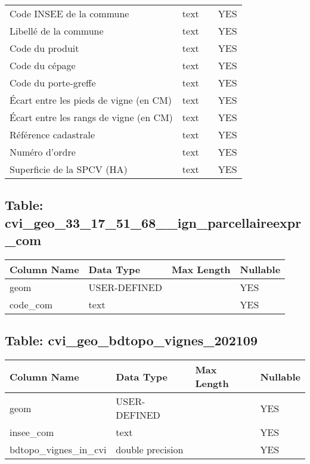 \begin{tabular}{llrl}
 Code INSEE de la commune               & text              &              & YES        \\
 Libellé de la commune                  & text              &              & YES        \\
 Code du produit                        & text              &              & YES        \\
 Code du cépage                         & text              &              & YES        \\
 Code du porte-greffe                   & text              &              & YES        \\
 Écart entre les pieds de vigne (en CM) & text              &              & YES        \\
 Écart entre les rangs de vigne (en CM) & text              &              & YES        \\
 Référence cadastrale                   & text              &              & YES        \\
 Numéro d'ordre                         & text              &              & YES        \\
 Superficie de la SPCV (HA)             & text              &              & YES        \\
\hline
\end{tabular}
\subsection*{Table: cvi_geo_33_17_51_68__ign_parcellaireexpr_com}
\begin{tabular}{llll}
\hline
 Column Name   & Data Type    & Max Length   & Nullable   \\
\hline
 geom          & USER-DEFINED &              & YES        \\
 code_com      & text         &              & YES        \\
\hline
\end{tabular}
\subsection*{Table: cvi_geo_bdtopo_vignes_202109}
\begin{tabular}{llll}
\hline
 Column Name          & Data Type        & Max Length   & Nullable   \\
\hline
 geom                 & USER-DEFINED     &              & YES        \\
 insee_com            & text             &              & YES        \\
 bdtopo_vignes_in_cvi & double precision &              & YES        \\
\hline
\end{tabular}
